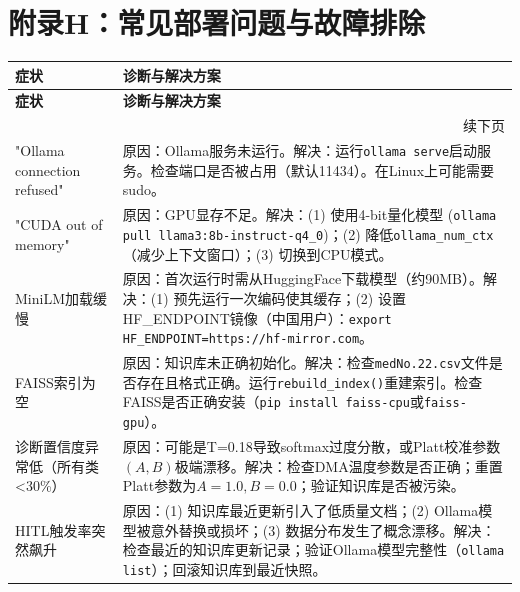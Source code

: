 \documentclass[11pt,a4paper]{ctexart}
\begin{document}
\normalsize





\newpage

\section*{附录H：常见部署问题与故障排除}

\begin{longtable}{p{4cm}p{10cm}}
\toprule
\textbf{症状} & \textbf{诊断与解决方案} \\
\midrule
\endfirsthead
\midrule
\textbf{症状} & \textbf{诊断与解决方案} \\
\midrule
\endhead
\midrule
\multicolumn{2}{r}{\small 续下页} \\
\endfoot
\bottomrule
\endlastfoot

"Ollama connection refused" & 原因：Ollama服务未运行。解决：运行\texttt{ollama serve}启动服务。检查端口是否被占用（默认11434）。在Linux上可能需要sudo。\\
\midrule

"CUDA out of memory" & 原因：GPU显存不足。解决：(1) 使用4-bit量化模型 (\texttt{ollama pull llama3:8b-instruct-q4\_0})；(2) 降低\texttt{ollama\_num\_ctx}（减少上下文窗口）；(3) 切换到CPU模式。\\
\midrule

MiniLM加载缓慢 & 原因：首次运行时需从HuggingFace下载模型（约90MB）。解决：(1) 预先运行一次编码使其缓存；(2) 设置HF\_ENDPOINT镜像（中国用户）：\texttt{export HF\_ENDPOINT=https://hf-mirror.com}。\\
\midrule

FAISS索引为空 & 原因：知识库未正确初始化。解决：检查\texttt{medNo.22.csv}文件是否存在且格式正确。运行\texttt{rebuild\_index()}重建索引。检查FAISS是否正确安装（\texttt{pip install faiss-cpu}或\texttt{faiss-gpu}）。\\
\midrule

诊断置信度异常低（所有类<30\%） & 原因：可能是T=0.18导致softmax过度分散，或Platt校准参数$(A,B)$极端漂移。解决：检查DMA温度参数是否正确；重置Platt参数为$A=1.0, B=0.0$；验证知识库是否被污染。\\
\midrule

HITL触发率突然飙升 & 原因：(1) 知识库最近更新引入了低质量文档；(2) Ollama模型被意外替换或损坏；(3) 数据分布发生了概念漂移。解决：检查最近的知识库更新记录；验证Ollama模型完整性（\texttt{ollama list}）；回滚知识库到最近快照。\\
\midrule


\end{longtable}
\end{document}
